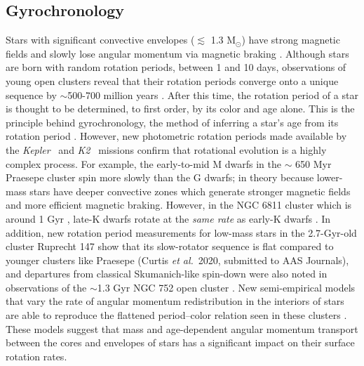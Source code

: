 \documentclass{aastex63}
\newcommand{\eg}{{\it e.g.}}
\newcommand{\etal}{{\it et al.}}
\newcommand{\kepler}{{\it Kepler}}
\newcommand{\Ktwo}{{\it K2}}
\newcommand{\ktwo}{\Ktwo}
\newcommand{\racomment}[1]{{\color{black}#1}}
\begin{document}
\subsection{Gyrochronology}

Stars with significant convective envelopes ($\lesssim$ 1.3 M$_\odot$) have
strong magnetic fields and slowly lose angular momentum via magnetic braking
\citep[\eg][]{schatzman1962, weber1967, kraft1967, skumanich1972, kawaler1988,
pinsonneault1989}.
Although stars are born with random rotation periods, between 1 and 10 days,
observations of young open clusters reveal that their rotation periods
converge onto a unique sequence by $\sim$500-700 million years
\citep[\eg][]{irwin2009, gallet2013}.
After this time, the rotation period of a star is thought to be determined, to
first order, by its color and age alone.
This is the principle behind gyrochronology, the method of inferring a star’s
age from its rotation period \citep[\eg][]{skumanich1972, barnes2003,
barnes2007, mamajek2008, barnes2010, meibom2011, meibom2015}.
However, new photometric rotation periods made available by the \kepler\
\citep{borucki2010} and \ktwo\ \citep{howell2014} missions
\citep[\eg][]{mcquillan2014, garcia2014, douglas2017, rebull2017, meibom2011,
meibom2015, curtis2019} confirm that rotational evolution is a highly complex
process.
For example, the early-to-mid M dwarfs in the $\sim$ 650 Myr Praesepe cluster
spin more slowly than the G dwarfs; in theory because lower-mass stars have
deeper convective zones which generate stronger magnetic fields and more
efficient magnetic braking.
However, in the NGC 6811 cluster which is around 1 Gyr \citep{janes2011,
sandquist2016},
late-K dwarfs rotate at the {\it same rate} as early-K dwarfs
\citep{curtis2019}.
\racomment{In addition, new rotation period measurements for low-mass stars in
the 2.7-Gyr-old cluster Ruprecht 147 show that its slow-rotator sequence is
flat compared to younger clusters like Praesepe (Curtis \etal\ 2020, submitted
to AAS Journals), and departures from classical Skumanich-like spin-down were
also noted in observations of the $\sim$1.3 Gyr NGC 752 open cluster
\citep{agueros2018}.}
New semi-empirical models that vary the rate of angular momentum
redistribution in the interiors of stars are able to reproduce the flattened
period--color relation \racomment{seen in these clusters \citep{spada2019}.}
These models suggest that mass and age-dependent angular momentum transport
between the cores and envelopes of stars has a significant impact on their
surface rotation rates.
\end{document}
